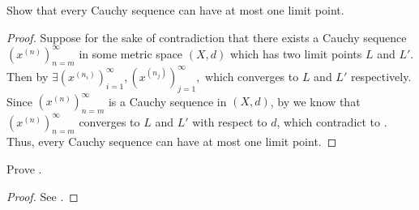 \begin{ex}\label{ii:ex:1.4.6}
  Show that every Cauchy sequence can have at most one limit point.
\end{ex}

\begin{proof}
  Suppose for the sake of contradiction that there exists a Cauchy sequence \((x^{(n)})_{n = m}^\infty\) in some metric space \((X, d)\) which has two limit points \(L\) and \(L'\).
  Then by  \(\exists (x^{(n_i)})_{i = 1}^\infty, (x^{(n_j)})_{j = 1}^\infty,\) which converges to \(L\) and \(L'\) respectively.
  Since \((x^{(n)})_{n = m}^\infty\) is a Cauchy sequence in \((X, d)\), by  we know that \((x^{(n)})_{n = m}^\infty\) converges to \(L\) and \(L'\) with respect to \(d\), which contradict to .
  Thus, every Cauchy sequence can have at most one limit point.
\end{proof}

\begin{ex}\label{ii:ex:1.4.7}
  Prove .
\end{ex}

\begin{proof}
  See .
\end{proof}

